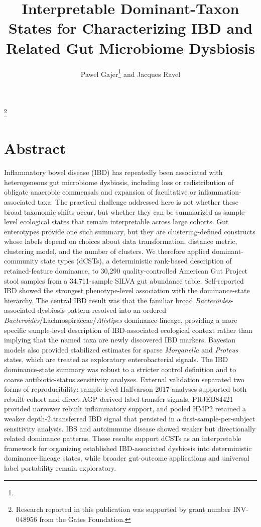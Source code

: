 \documentclass[
  11pt,
]{article}
\title{Interpretable Dominant-Taxon States for Characterizing IBD and
Related Gut Microbiome Dysbiosis}
\author{\parbox{0.9\textwidth}{\centering Pawel Gajer\thanks{\paperaffiliation} and Jacques Ravel\protect\footnotemark[1]}}
\date{}
\newcommand{\taxon}[1]{\emph{#1}}
\newcommand{\paperfundingnote}{Research reported in this publication was supported by grant number INV-048956 from the Gates Foundation.}
\newcommand{\blfootnote}[1]{%
  \begingroup
  \renewcommand{\thefootnote}{}\footnote{#1}%
  \addtocounter{footnote}{-1}%
  \endgroup
}
\newif\ifshowbuildstamp
\providecommand{\manuscriptversion}{unversioned}
\providecommand{\manuscriptbuildnumber}{NA}
\providecommand{\manuscriptcommit}{unknown}
\providecommand{\manuscriptbuilddatetime}{unknown}
\begin{document}
\maketitle
\blfootnote{\paperfundingnote}
\ifshowbuildstamp
\begin{center}
\footnotesize
Built \manuscriptbuilddatetime
\end{center}
\vspace{0.35em}
\fi

\section{Abstract}\label{abstract}

Inflammatory bowel disease (IBD) has repeatedly been associated with
heterogeneous gut microbiome dysbiosis, including loss or redistribution
of obligate anaerobic commensals and expansion of facultative or
inflammation-associated taxa. The practical challenge addressed here is
not whether these broad taxonomic shifts occur, but whether they can be
summarized as sample-level ecological states that remain interpretable
across large cohorts. Gut enterotypes provide one such summary, but they
are clustering-defined constructs whose labels depend on choices about
data transformation, distance metric, clustering model, and the number of
clusters. We therefore applied dominant-community state types (dCSTs), a
deterministic rank-based description of retained-feature dominance, to
30,290 quality-controlled American Gut Project stool samples from a
34,711-sample SILVA gut abundance table. Self-reported IBD showed the
strongest phenotype-level association with the dominance-state
hierarchy. The central IBD result was that the familiar broad
\taxon{Bacteroides}-associated dysbiosis pattern resolved into an
ordered \taxon{Bacteroides}/Lachnospiraceae/\taxon{Alistipes}
dominance-lineage, providing a more specific sample-level description of
IBD-associated ecological context rather than implying that the named
taxa are newly discovered IBD markers. Bayesian models also provided stabilized estimates for sparse
\taxon{Morganella} and \taxon{Proteus} states, which are treated as
exploratory enterobacterial signals. The IBD dominance-state summary was
robust to a stricter control definition and to coarse antibiotic-status
sensitivity analyses. External validation separated two forms of
reproducibility: sample-level Halfvarson 2017 analyses supported both
rebuilt-cohort and direct AGP-derived label-transfer signals,
PRJEB84421 provided narrower rebuilt inflammatory support, and pooled
HMP2 retained a weaker depth-2 transferred IBD signal that persisted in a
first-sample-per-subject sensitivity analysis. IBS and autoimmune disease
showed weaker but directionally related dominance patterns. These results
support dCSTs as an interpretable framework for organizing established
IBD-associated dysbiosis into deterministic dominance-lineage states,
while broader gut-outcome applications and universal label portability
remain exploratory.
\end{document}
